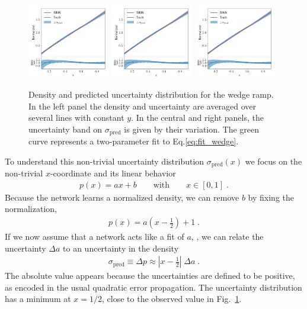 \begin{figure}[t]
\centering
\includegraphics[width=0.32\textwidth, page=1]{./figures/bINN/linear_1dplots}
\includegraphics[width=0.32\textwidth, page=2]{./figures/bINN/linear_1dplots}
\includegraphics[width=0.32\textwidth, page=3]{./figures/bINN/linear_1dplots}
\caption{Density and predicted uncertainty distribution for the wedge
  ramp. In the left panel the density and uncertainty are averaged
  over several lines with constant $y$. In the central and right
  panels, the uncertainty band on $\sigma_\text{pred}$ is given by
  their variation.  The green curve represents a two-parameter fit to
  Eq.\eqref{eq:fit_wedge}.}
  \label{fig:linear_unc}
\end{figure}

To understand this non-trivial uncertainty distribution
$\sigma_\text{pred}(x)$ we focus on the non-trivial $x$-coordinate and
its linear behavior
%
\begin{align}
  p(x) = a  x + b
  \qquad \text{with} \qquad x \in [0,1] \; .
\end{align}
%
Because the network learns a normalized density, we can remove $b$ by
fixing the normalization,
%
\begin{align}
  p(x) = a \left( x - \frac{1}{2} \right) + 1 \; .
\end{align}
%
If we now assume that a network acts like a fit of $a$, , we can relate 
the uncertainty $\Delta a$ to an uncertainty in the density
%
\begin{align}
\sigma_\text{pred} \equiv \Delta p \approx \left| x - \frac{1}{2} \right| \; \Delta a \; .
\label{eq:simple_wedge}
\end{align}
%
The absolute value appears because the uncertainties are defined to be
positive, as encoded in the usual quadratic error propagation. The
uncertainty distribution has a minimum at $x=1/2$, close to the
observed value in Fig.~\ref{fig:linear_unc}.

